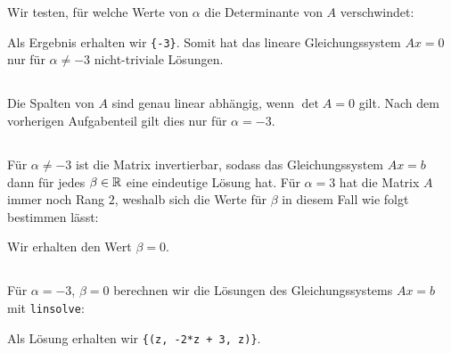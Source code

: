 \section{}





\subsection{}

Wir testen, für welche Werte von $\alpha$ die Determinante von $A$ verschwindet:



Als Ergebnis erhalten wir \texttt{\{-3\}}.
Somit hat das lineare Gleichungssystem $Ax = 0$ nur für $\alpha \neq -3$ nicht-triviale Lösungen.





\subsection{}

Die Spalten von $A$ sind genau linear abhängig, wenn $\det A = 0$ gilt.
Nach dem vorherigen Aufgabenteil gilt dies nur für $\alpha = -3$.





\subsection{}

Für $\alpha \neq -3$ ist die Matrix invertierbar, sodass das Gleichungssystem $Ax = b$ dann für jedes $\beta \in \mathbb{R}$ eine eindeutige Lösung hat.
Für $\alpha = 3$ hat die Matrix $A$ immer noch Rang $2$, weshalb sich die Werte für $\beta$ in diesem Fall wie folgt bestimmen lässt:



Wir erhalten den Wert $\beta = 0$.





\subsection{}

Für $\alpha = -3$, $\beta = 0$ berechnen wir die Lösungen des Gleichungssystems $Ax = b$ mit \texttt{linsolve}:



Als Lösung erhalten wir \texttt{\{(z, -2*z + 3, z)\}}.










